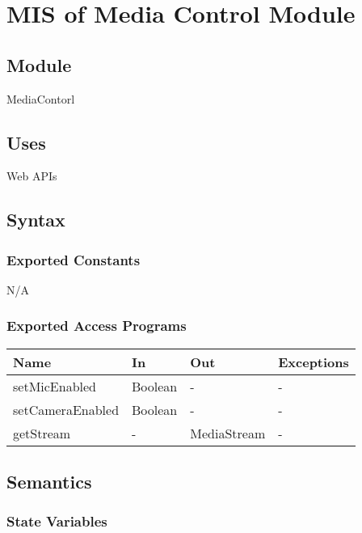 \documentclass[12pt, titlepage]{article}
\begin{document}
\section{MIS of Media Control Module} \label{sec:mediactrl}

\subsection{Module}

MediaContorl

\subsection{Uses}

\noindent Web APIs

\subsection{Syntax}

\subsubsection{Exported Constants}

N/A

\subsubsection{Exported Access Programs}

\begin{center}
  \begin{tabular}{p{4cm} p{4cm} p{4cm} p{2cm}}
    \hline
    \textbf{Name}          & \textbf{In}   & \textbf{Out}      & \textbf{Exceptions} \\
    \hline
    setMicEnabled    & Boolean & -           & -             \\
    setCameraEnabled & Boolean & -           & -             \\
    getStream        & -       & MediaStream & -             \\
    \hline
  \end{tabular}
\end{center}

\subsection{Semantics}

\subsubsection{State Variables}
\end{document}
